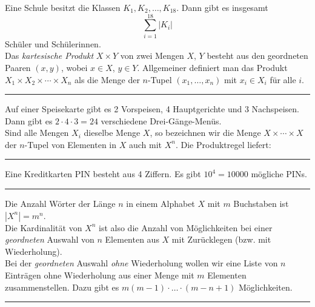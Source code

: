 \documentclass[9pt]{article}
\begin{document}
\begin{bsp}
Eine Schule besitzt die Klassen $K_1, K_2, \dots, K_{18}$. Dann gibt es insgesamt \[\sum_{i=1}^{18} |K_i|\] Schüler und Schülerinnen. \\
Das \textit{kartesische Produkt} $X \times Y$ von zwei Mengen $X$, $Y$ besteht aus den geordneten Paaren $(x, y)$, wobei $x \in X$, $y \in Y$. Allgemeiner definiert man das Produkt $X_1 \times X_2 \times \cdots \times X_n$ als die Menge der $n$-Tupel $(x_1, \dots, x_n)$ mit $x_i \in X_i$ für alle $i$.
\end{bsp} \noindent \rule{8cm}{0.4pt} 



\begin{bsp}
Auf einer Speisekarte gibt es 2 Vorspeisen, 4 Hauptgerichte und 3 Nachspeisen. Dann gibt es 
$2 \cdot 4 \cdot 3 = 24$ 
verschiedene Drei-Gänge-Menüs. \\
Sind alle Mengen $X_i$ dieselbe Menge $X$, so bezeichnen wir die Menge $X \times \cdots \times X$ der $n$-Tupel von Elementen in $X$ auch mit $X^n$. Die Produktregel liefert:
\end{bsp} \noindent \rule{8cm}{0.4pt}


\begin{bsp}
Eine Kreditkarten PIN besteht aus 4 Ziffern. Es gibt $10^4 =
10000$ mögliche PINs.
\end{bsp} \noindent \rule{8cm}{0.4pt}

\begin{bsp}
Die Anzahl Wörter der Länge $n$ in einem Alphabet $X$ mit $m$ Buchstaben ist
$\left| X^n \right| = m^n$. \\
Die Kardinalität von $X^n$ ist also die Anzahl von Möglichkeiten bei einer \textit{geordneten} Auswahl von $n$ Elementen aus $X$ mit Zurücklegen (bzw. mit Wiederholung). \\
Bei der \textit{geordneten} Auswahl \textit{ohne} Wiederholung wollen wir eine Liste von $n$ Einträgen ohne Wiederholung aus einer Menge mit $m$ Elementen zusammenstellen. Dazu gibt es
$m(m - 1) \cdot \dots \cdot (m - n + 1)$ Möglichkeiten.
\end{bsp} \noindent \rule{8cm}{0.4pt} 
\end{document}
